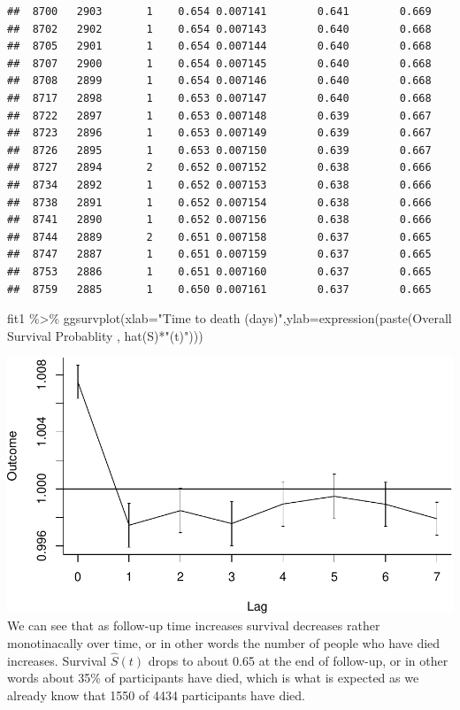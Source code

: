 \documentclass[
]{book}
\newenvironment{Shaded}{\begin{snugshade}}{\end{snugshade}}
\newcommand{\AttributeTok}[1]{\textcolor[rgb]{0.77,0.63,0.00}{#1}}
\newcommand{\FunctionTok}[1]{\textcolor[rgb]{0.00,0.00,0.00}{#1}}
\newcommand{\NormalTok}[1]{#1}
\newcommand{\SpecialCharTok}[1]{\textcolor[rgb]{0.00,0.00,0.00}{#1}}
\newcommand{\StringTok}[1]{\textcolor[rgb]{0.31,0.60,0.02}{#1}}
\begin{document}
\begin{verbatim}
##  8700   2903       1    0.654 0.007141        0.641        0.669
##  8702   2902       1    0.654 0.007143        0.640        0.668
##  8705   2901       1    0.654 0.007144        0.640        0.668
##  8707   2900       1    0.654 0.007145        0.640        0.668
##  8708   2899       1    0.654 0.007146        0.640        0.668
##  8717   2898       1    0.653 0.007147        0.640        0.668
##  8722   2897       1    0.653 0.007148        0.639        0.667
##  8723   2896       1    0.653 0.007149        0.639        0.667
##  8726   2895       1    0.653 0.007150        0.639        0.667
##  8727   2894       2    0.652 0.007152        0.638        0.666
##  8734   2892       1    0.652 0.007153        0.638        0.666
##  8738   2891       1    0.652 0.007154        0.638        0.666
##  8741   2890       1    0.652 0.007156        0.638        0.666
##  8744   2889       2    0.651 0.007158        0.637        0.665
##  8747   2887       1    0.651 0.007159        0.637        0.665
##  8753   2886       1    0.651 0.007160        0.637        0.665
##  8759   2885       1    0.650 0.007161        0.637        0.665
\end{verbatim}

\begin{Shaded}
\begin{Highlighting}[]
\NormalTok{fit1 }\SpecialCharTok{\%\textgreater{}\%}
\FunctionTok{ggsurvplot}\NormalTok{(}\AttributeTok{xlab=}\StringTok{"Time to death (days)"}\NormalTok{,}\AttributeTok{ylab=}\FunctionTok{expression}\NormalTok{(}\FunctionTok{paste}\NormalTok{(}\StringTok{\textquotesingle{}Overall Survival Probablity \textquotesingle{}}\NormalTok{, }\FunctionTok{hat}\NormalTok{(S)}\SpecialCharTok{*}\StringTok{"(t)"}\NormalTok{)))}
\end{Highlighting}
\end{Shaded}

\includegraphics{adv_epi_analysis_files/figure-latex/unnamed-chunk-95-1.pdf}
We can see that as follow-up time increases survival decreases rather monotinacally over time, or in other words the number of people who have died increases. Survival \(\hat{S}(t)\) drops to about 0.65 at the end of follow-up, or in other words about 35\% of participants have died, which is what is expected as we already know that 1550 of 4434 participants have died.
\end{document}
